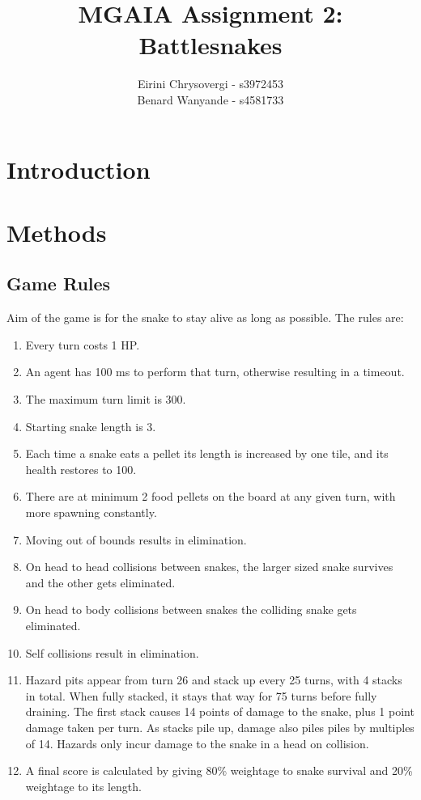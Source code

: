 \documentclass[12pt,a4paper]{article}
\title{MGAIA Assignment 2: Battlesnakes}
\author{
    Eirini Chrysovergi - s3972453 \\
    Benard Wanyande - s4581733 \\
    }
\begin{document}
\maketitle

\tableofcontents

\section{Introduction}\label{sec:intro}

\section{Methods}\label{sec:methods}

\subsection{Game Rules}
Aim of the game is for the snake to stay alive as long as possible. The rules are:
\begin{enumerate}
    \item Every turn costs 1 HP. 
    \item An agent has 100 ms to perform that turn, otherwise resulting in a timeout. 
    \item The maximum turn limit is 300. 
    \item Starting snake length is 3.
    \item Each time a snake eats a pellet its length is increased by one tile, and its health restores to 100.
    \item There are at minimum 2 food pellets on the board at any given turn, with more spawning constantly.
    \item Moving out of bounds results in elimination.
    \item On head to head collisions between snakes, the larger sized snake survives and the other gets eliminated.
    \item On head to body collisions between snakes the colliding snake gets eliminated. 
    \item Self collisions result in elimination.
    \item Hazard pits appear from turn 26 and stack up every 25 turns, with 4 stacks in total. When fully stacked, it stays that way for 75 turns before fully draining. The first stack causes 14 points of damage to the snake, plus 1 point damage taken per turn. As stacks pile up, damage also piles piles by multiples of 14. Hazards only incur damage to the snake in a head on collision.
    \item A final score is calculated by giving 80\% weightage to snake survival and 20\% weightage to its length.
\end{enumerate}
\end{document}
